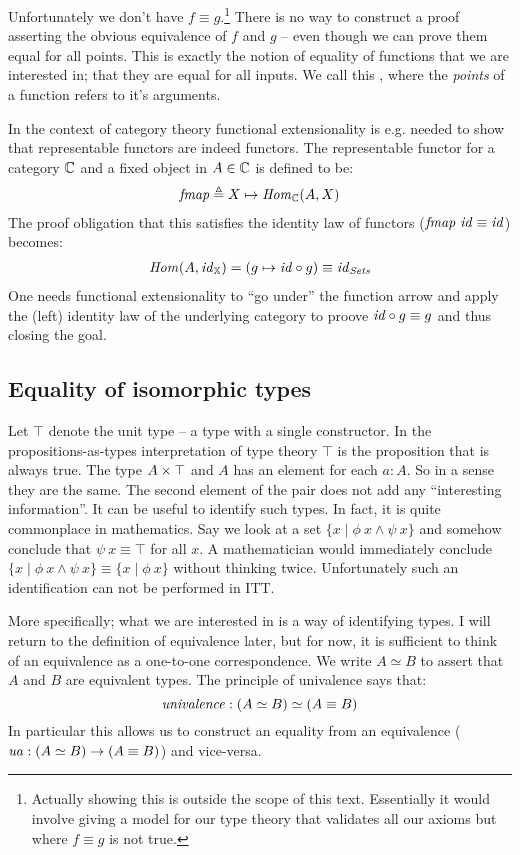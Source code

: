 Unfortunately we don't have $f \equiv g$.\footnote{Actually showing this is
outside the scope of this text. Essentially it would involve giving a model
for our type theory that validates all our axioms but where $f \equiv g$ is
not true.} There is no way to construct a proof asserting the obvious
equivalence of $f$ and $g$ -- even though we can prove them equal for all
points. This is exactly the notion of equality of functions that we are
interested in; that they are equal for all inputs. We call this
, where the \emph{points} of a function refers
to it's arguments.

In the context of category theory functional extensionality is e.g. needed to
show that representable functors are indeed functors. The representable functor
for a category $\mathbb{C}$ and a fixed object in $A \in \mathbb{C}$ is defined to be:
%
\begin{align*}
\mathit{fmap} \mathrel{\triangleq} X \mapsto \mathit{Hom}_{\mathbb{C}}(A, X)
\end{align*}
%
The proof obligation that this satisfies the identity law of functors
($\mathit{fmap}\ \mathit{id} \equiv \mathit{id}$) becomes:
%
\begin{align*}
\mathit{Hom}(A, \mathit{id}_{\mathbb{X}}) = (g \mapsto \mathit{id} \circ g) \equiv \mathit{id}_{\mathit{Sets}}
\end{align*}
%
One needs functional extensionality to ``go under'' the function arrow and apply
the (left) identity law of the underlying category to proove $\mathit{id} \circ g
\equiv g$ and thus closing the goal.
%
\subsection{Equality of isomorphic types}
%
Let $\top$ denote the unit type -- a type with a single constructor. In
the propositions-as-types interpretation of type theory $\top$ is the
proposition that is always true. The type $A \times \top$ and $A$ has an element for
each $a : A$. So in a sense they are the same. The second element of the pair
does not add any ``interesting information''. It can be useful to identify such
types. In fact, it is quite commonplace in mathematics. Say we look at a set
$\{x \mid
\phi\ x \land \psi\ x\}$ and somehow conclude that $\psi\ x \equiv \top$ for all
$x$. A mathematician would immediately conclude $\{x \mid \phi\ x \land
\psi\ x\} \equiv \{x \mid \phi\ x\}$ without thinking twice. Unfortunately such
an identification can not be performed in ITT.

More specifically; what we are interested in is a way of identifying
 types. I will return to the definition of equivalence later,
but for now, it is sufficient to think of an equivalence as a one-to-one
correspondence. We write $A \simeq B$ to assert that $A$ and $B$ are equivalent
types. The principle of univalence says that:
%
$$\mathit{univalence} \mathrel{:} (A \simeq B) \simeq (A \equiv B)$$
%
In particular this allows us to construct an equality from an equivalence
($\mathit{ua} \mathrel{:} (A \simeq B) \to (A \equiv B)$) and vice-versa.

